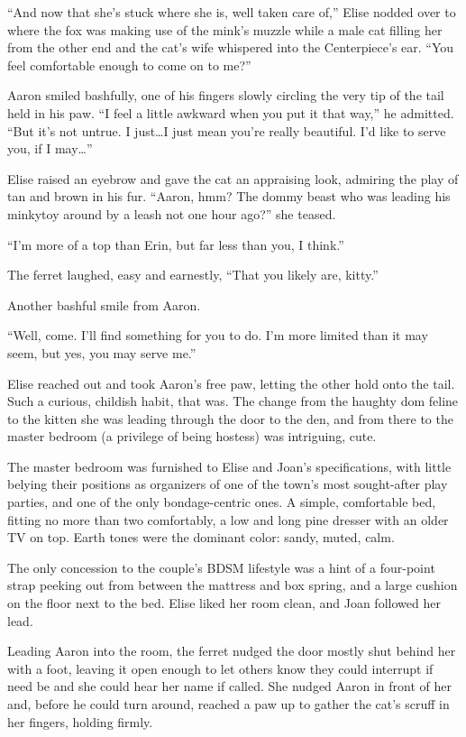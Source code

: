 ``And now that she's stuck where she is, well taken care of,'' Elise
nodded over to where the fox was making use of the mink's muzzle while a
male cat filling her from the other end and the cat's wife whispered
into the Centerpiece's ear. ``You feel comfortable enough to come on to
me?''

Aaron smiled bashfully, one of his fingers slowly circling the very tip
of the tail held in his paw. ``I feel a little awkward when you put it
that way,'' he admitted. ``But it's not untrue. I just\ldots{}I just
mean you're really beautiful. I'd like to serve you, if I may\ldots{}''

Elise raised an eyebrow and gave the cat an appraising look, admiring
the play of tan and brown in his fur. ``Aaron, hmm? The dommy beast who
was leading his minkytoy around by a leash not one hour ago?'' she
teased.

``I'm more of a top than Erin, but far less than you, I think.''

The ferret laughed, easy and earnestly, ``That you likely are, kitty.''

Another bashful smile from Aaron.

``Well, come. I'll find something for you to do. I'm more limited than
it may seem, but yes, you may serve me.''

Elise reached out and took Aaron's free paw, letting the other hold onto
the tail. Such a curious, childish habit, that was. The change from the
haughty dom feline to the kitten she was leading through the door to the
den, and from there to the master bedroom (a privilege of being hostess)
was intriguing, cute.

The master bedroom was furnished to Elise and Joan's specifications,
with little belying their positions as organizers of one of the town's
most sought-after play parties, and one of the only bondage-centric
ones. A simple, comfortable bed, fitting no more than two comfortably, a
low and long pine dresser with an older TV on top. Earth tones were the
dominant color: sandy, muted, calm.

The only concession to the couple's BDSM lifestyle was a hint of a
four-point strap peeking out from between the mattress and box spring,
and a large cushion on the floor next to the bed. Elise liked her room
clean, and Joan followed her lead.

Leading Aaron into the room, the ferret nudged the door mostly shut
behind her with a foot, leaving it open enough to let others know they
could interrupt if need be and she could hear her name if called. She
nudged Aaron in front of her and, before he could turn around, reached a
paw up to gather the cat's scruff in her fingers, holding firmly.

